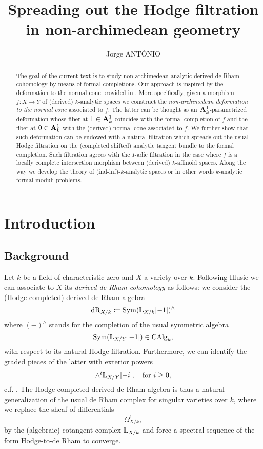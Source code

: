 \documentclass[10pt,a4paper,reqno]{amsart} %
\theoremstyle{plain}
\theoremstyle{definition}
\theoremstyle{remark}
\numberwithin{equation}{section}
\begin{document}
\title{Spreading out the Hodge filtration in non-archimedean geometry}

\author{Jorge ANT\'ONIO}
\address{Jorge ANT\'ONIO, IRMA, UMR 7501
7 rue René-Descartes
67084 Strasbourg Cedex}
\maketitle
\begin{abstract}
    The goal of the current text is to study non-archimedean analytic derived de Rham cohomology 
    by means of formal completions. Our approach is inspired by the deformation to the normal cone provided in \cite{Gaitsgory_Study_II}.
    More specifically, given a morphism $f \colon X \to Y$ of (derived) $k$-analytic spaces we construct the \emph{non-archimedean deformation to the normal cone}
    associated to $f$. The latter can be thought as an $\mathbf A^1_k$-parametrized deformation whose fiber at $1 \in \mathbf A^1_k$ coincides with the formal completion of $f$
    and the fiber at $0 \in \mathbf A^1_k$ with the (derived) normal cone associated to $f$.
    We further show that such deformation can be endowed with a natural filtration which spreads out the usual Hodge filtration on the (completed shifted) analytic
    tangent bundle to the formal completion. Such filtration agrees with the $I$-adic filtration in the case where $f$ is a locally complete intersection morphism
    between (derived) $k$-affinoid spaces.
    Along the way we develop the theory of (ind-inf)-$k$-analytic spaces or in other words $k$-analytic formal moduli problems.
\end{abstract}

\tableofcontents

\section{Introduction}
\subsection{Background} Let $k$ be a field of characteristic zero and $X$ a variety over $k$. Following Illusie
we can associate to $X$ its \emph{derived de Rham
cohomology} as follows: we consider the
(Hodge completed) derived de Rham algebra
    \[
        \mathrm{dR}_{X/ k} \coloneqq  \operatorname{Sym}(\mathbb L_{X/ k}[-1])^\wedge 
    \]
where $(-)^\wedge$ stands for the completion of the usual symmetric algebra 
    \[\operatorname{Sym}(\mathbb L_{X/ Y}[-1]) \in \mathrm{CAlg}_k,\]
with respect to its natural Hodge filtration. Furthermore, we can identify
the graded pieces of the latter with exterior powers
    \[
        \wedge^i \mathbb L_{X/ Y} [-i], \quad \mathrm{for} \ i \ge 0,
    \]
c.f. \cite[Vol. II, \S VIII]{Illusie_Complexe_1971}.
The Hodge completed derived de Rham algebra is thus a natural generalization of the usual de Rham complex for singular varieties over $k$,
where we replace the sheaf of differentials
    \[
        \Omega^1_{X/ k},  
    \]
by the (algebraic) cotangent complex $\mathbb L_{X/ k}$ and force a spectral sequence of the form Hodge-to-de Rham to converge.
\end{document}
